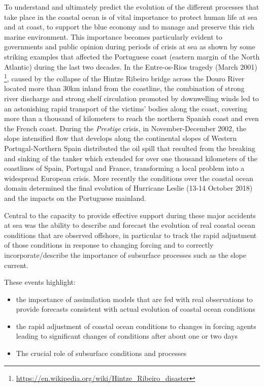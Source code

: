 To understand and ultimately predict the evolution of the different
processes that take place in the coastal ocean is of vital importance
to protect human life at sea and at coast, to support the blue economy
and to manage and preserve this rich marine environment. This
importance becomes particularly evident to governments and public
opinion during periods of crisis at sea as shown by some striking
examples that affected the Portuguese coast (eastern margin of the
North Atlantic) during the last two decades. In the Entre-os-Rios
tragedy (March 2001)
\footnote{\url{https://en.wikipedia.org/wiki/Hintze_Ribeiro_disaster}},
caused by the collapse of the Hintze Ribeiro bridge across the Douro
River located more than 30km inland from the coastline, the
combination of strong river discharge and strong shelf circulation
promoted by downwelling winds led to an astonishing rapid transport of
the victims' bodies along the coast, covering more than a thousand of
kilometers to reach the northern Spanish coast and even the French
coast. During the \emph{Prestige} crisis, in November-December 2002,
the slope intensified flow that develops along the continental slopes
of Western Portugal-Northern Spain distributed the oil spill that
resulted from the breaking and sinking of the tanker which extended
for over one thousand kilometers of the coastlines of Spain, Portugal
and France, transforming a local problem into a widespread European
crisis. More recently the conditions over the coastal ocean domain
determined the final evolution of Hurricane Leslie (13-14 October
2018) and the impacts on the Portuguese mainland.
 
Central to the capacity to provide effective support during these
major accidents at sea was the ability to describe and forecast the
evolution of real coastal ocean conditions that are observed offshore,
in particular to track the rapid adjustment of those conditions in
response to changing forcing and to correctly incorporate/describe the
importance of subsurface processes such as the slope current.
 
These events highlight:

\begin{itemize}
  
\item the importance of assimilation models that are fed with real
  observations to provide forecasts consistent with actual evolution
  of coastal ocean conditions

\item the rapid adjustment of coastal ocean conditions to changes in
  forcing agents leading to significant changes of conditions after
  about one or two days

\item The crucial role of subsurface conditions and processes
 
\end{itemize}

